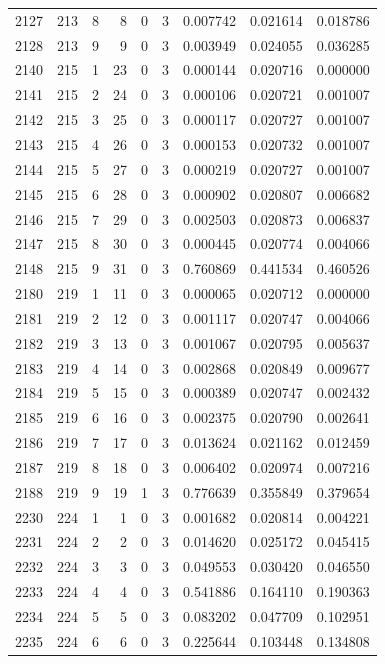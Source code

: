 \begin{longtable}{rrrrrrrrr}
2127 & 213 & 8 & 8 & 0 & 3 & 0.007742 & 0.021614 & 0.018786 \\
2128 & 213 & 9 & 9 & 0 & 3 & 0.003949 & 0.024055 & 0.036285 \\
2140 & 215 & 1 & 23 & 0 & 3 & 0.000144 & 0.020716 & 0.000000 \\
2141 & 215 & 2 & 24 & 0 & 3 & 0.000106 & 0.020721 & 0.001007 \\
2142 & 215 & 3 & 25 & 0 & 3 & 0.000117 & 0.020727 & 0.001007 \\
2143 & 215 & 4 & 26 & 0 & 3 & 0.000153 & 0.020732 & 0.001007 \\
2144 & 215 & 5 & 27 & 0 & 3 & 0.000219 & 0.020727 & 0.001007 \\
2145 & 215 & 6 & 28 & 0 & 3 & 0.000902 & 0.020807 & 0.006682 \\
2146 & 215 & 7 & 29 & 0 & 3 & 0.002503 & 0.020873 & 0.006837 \\
2147 & 215 & 8 & 30 & 0 & 3 & 0.000445 & 0.020774 & 0.004066 \\
2148 & 215 & 9 & 31 & 0 & 3 & 0.760869 & 0.441534 & 0.460526 \\
2180 & 219 & 1 & 11 & 0 & 3 & 0.000065 & 0.020712 & 0.000000 \\
2181 & 219 & 2 & 12 & 0 & 3 & 0.001117 & 0.020747 & 0.004066 \\
2182 & 219 & 3 & 13 & 0 & 3 & 0.001067 & 0.020795 & 0.005637 \\
2183 & 219 & 4 & 14 & 0 & 3 & 0.002868 & 0.020849 & 0.009677 \\
2184 & 219 & 5 & 15 & 0 & 3 & 0.000389 & 0.020747 & 0.002432 \\
2185 & 219 & 6 & 16 & 0 & 3 & 0.002375 & 0.020790 & 0.002641 \\
2186 & 219 & 7 & 17 & 0 & 3 & 0.013624 & 0.021162 & 0.012459 \\
2187 & 219 & 8 & 18 & 0 & 3 & 0.006402 & 0.020974 & 0.007216 \\
2188 & 219 & 9 & 19 & 1 & 3 & 0.776639 & 0.355849 & 0.379654 \\
2230 & 224 & 1 & 1 & 0 & 3 & 0.001682 & 0.020814 & 0.004221 \\
2231 & 224 & 2 & 2 & 0 & 3 & 0.014620 & 0.025172 & 0.045415 \\
2232 & 224 & 3 & 3 & 0 & 3 & 0.049553 & 0.030420 & 0.046550 \\
2233 & 224 & 4 & 4 & 0 & 3 & 0.541886 & 0.164110 & 0.190363 \\
2234 & 224 & 5 & 5 & 0 & 3 & 0.083202 & 0.047709 & 0.102951 \\
2235 & 224 & 6 & 6 & 0 & 3 & 0.225644 & 0.103448 & 0.134808 \\

\end{longtable}
